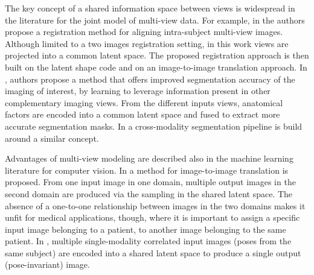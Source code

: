 The key concept of a shared information space between views is widespread in the literature for the joint model of multi-view data.
For example, in \cite{Qin2019} the authors propose
a registration method for aligning intra-subject multi-view images.
Although limited to a two images registration setting,
in this work views are projected into a common latent space.
The proposed registration approach is then built on the latent shape code and on an image-to-image translation approach.
%
%
In \cite{Chartsias2021}, authors propose
a method that offers improved segmentation accuracy of the imaging of interest, by learning to leverage information present in other complementary imaging views.
From the different inputs views, anatomical factors are encoded into a common latent space and fused to extract more accurate segmentation masks.
%
%
In \cite{Yang2020} a cross-modality segmentation pipeline is build around a similar concept.

Advantages of multi-view modeling are described also in the machine learning literature for computer vision.
%
In \cite{Huang2018}
a method for image-to-image translation is proposed.
From one input image in one domain, multiple output images in the second domain are produced via the sampling in the shared latent space.
The absence of a one-to-one relationship between images in the two domains makes it unfit for medical applications, though,
where it is important to assign a specific input image belonging to a patient, to another image belonging to the same patient.
In \cite{Tran2017},
multiple single-modality correlated input images (poses from the same subject) are encoded into a shared latent space to produce a single output (pose-invariant) image.

